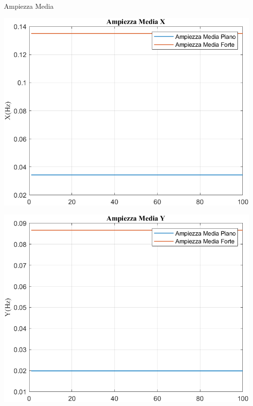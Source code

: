 \documentclass[beamer]{standalone}
\begin{document}
	\begin{frame}{{Ampiezza Media}}
		\begin{minipage}{.45\textwidth}
			\centering\includegraphics[width=.9\textwidth]{figure/Acc/Trasformata/Ampiezza MediaX}
		\end{minipage}
		\hspace{.05\textwidth}
		\begin{minipage}{.45\textwidth}
			\centering\includegraphics[width=.9\textwidth]{figure/Acc/Trasformata/Ampiezza MediaY}
		\end{minipage}
	\end{frame}
\end{document}
